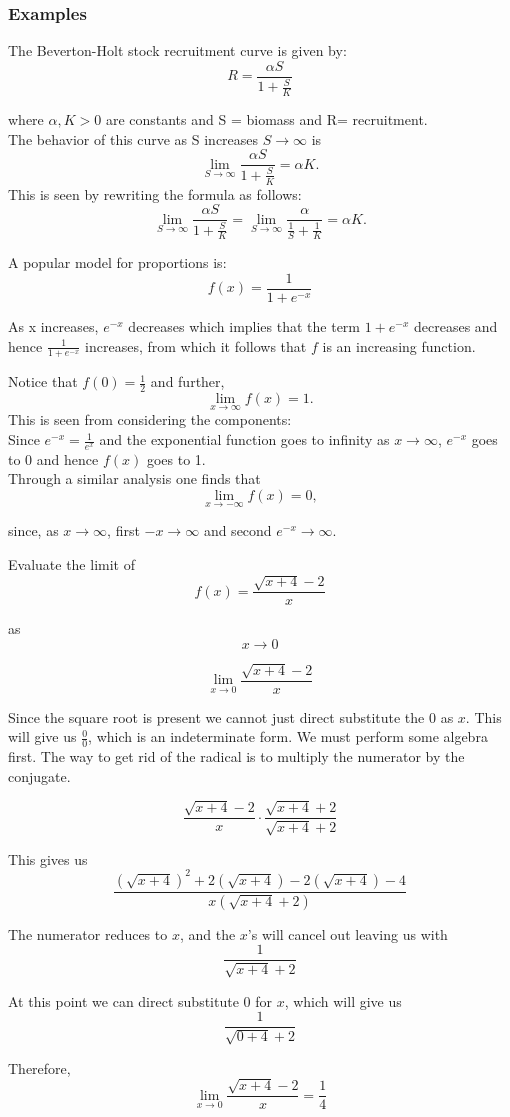 \documentclass[12pt,a4paper]{article}
\theoremstyle{regla}
\theoremstyle{remark}
\theoremstyle{definition}
\theoremstyle{nonumberbreak}
\begin{document}
\subsubsection{Examples}
\begin{xmpl}
The Beverton-Holt stock recruitment curve is given by:
$$
R=\frac{\alpha S}{1+\frac{S}{K}}
$$

where $\alpha, K >0$ are constants and S = biomass and R= recruitment.\\

The behavior of this curve as S increases $S\rightarrow\infty$ is
$$
\lim_{S\to\infty}\frac{\alpha S}{1+\frac{S}{K}} =\alpha K .
$$
This is seen by rewriting the formula as follows:
$$
\lim_{S\to\infty}\frac{\alpha S}{1+\frac{S}{K}} =
\lim_{S\to\infty}\frac{\alpha }{\frac{1}{S}+\frac{1}{K}} =\alpha K .
$$

\end{xmpl}
\begin{xmpl}
A popular model for proportions is: 
$$
f(x) = \frac{1}{1+e^{-x}}
$$

As x increases, $e^{-x}$ decreases which implies that the
term $1+e^{-x}$ decreases and hence
$\frac{1}{1+e^{-x}}$ increases, from which it follows that $f$ is an
increasing function.

Notice that $f(0)=\frac{1}{2}$ and further, 
$$\lim_{x\to\infty} f(x) = 1.$$
This is seen from considering the 
components: \\
Since $e^{-x} = \frac{1}{e^{x}}$ and the exponential function goes to infinity as $x\to\infty$, $e^{-x}$
goes to $0$ and hence $f(x)$ goes to 1.\\

Through a similar analysis one finds that 
$$\lim_{x\to-\infty} f(x)=0 ,$$

 

since, as $x\rightarrow \infty$, first $-x\rightarrow \infty$ and second $e^{-x} \rightarrow \infty$.
\end{xmpl}
\begin{xmpl}
Evaluate the limit of $$f(x) = \frac{\sqrt{x + 4} - 2}{x}$$

as $$x \to 0$$

$$\lim_{x \to 0} \frac{\sqrt{x + 4} - 2}{x}$$

Since the square root is present we cannot just direct substitute the 0 as $x$. This will give us $\frac{0}{0}$, which is an indeterminate form. We must perform some algebra first. The way to get rid of the radical is to multiply the numerator by the conjugate.

$$\frac{\sqrt{x + 4} - 2}{x} \cdot \frac{\sqrt{x + 4} + 2}{\sqrt{x + 4} + 2}$$

This gives us $$\frac{(\sqrt{x + 4})^2 + 2(\sqrt{x+4}) - 2(\sqrt{x+4}) -4}{x(\sqrt{x + 4} + 2)}$$

The numerator reduces to $x$, and the $x$'s will cancel out leaving us with $$\frac{1}{\sqrt{x + 4} + 2}$$

At this point we can direct substitute 0 for $x$, which will give us $$\frac{1}{\sqrt{0 + 4} + 2}$$

Therefore, $$\lim_{x \to 0} \frac{\sqrt{x + 4} - 2}{x} = \frac{1}{4}$$
\end{xmpl}
\end{document}
